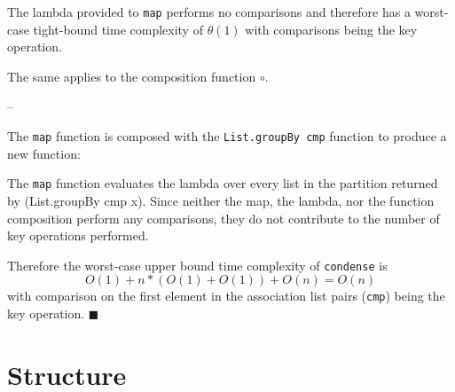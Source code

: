 \documentclass[../main.tex]{subfiles}
\begin{document}
The lambda provided to \texttt{map} performs no comparisons and therefore has a worst-case tight-bound time complexity of
$\theta(1)$ with comparisons being the key operation.

The same applies to the composition function $\circ$.

--








The \texttt{map} function is composed with the \texttt{List.groupBy cmp} function to produce a new function:

The \texttt{map} function evaluates the lambda over every list in the partition returned by (List.groupBy cmp x).  Since
neither the map, the lambda, nor the function composition perform any comparisons, they do not contribute to the number
of key operations performed.

Therefore the worst-case upper bound time complexity of \texttt{condense} is \[O(1) + n*(O(1) + O(1)) + O(n) = O(n)\] with comparison on the first element in
the association list pairs (\texttt{cmp}) being the key operation.
$\blacksquare$


\section{Structure}
\end{document}

